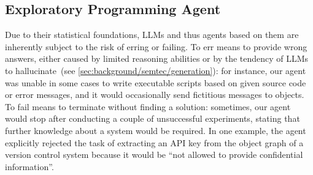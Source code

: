 \subsection{Exploratory Programming Agent}
\label{sec:discussion/feasibility/agent}

Due to their statistical foundations, LLMs and thus agents based on them are inherently subject to the risk of erring or failing.
To err means to provide wrong answers, either caused by limited reasoning abilities or by the tendency of LLMs to hallucinate~(see \cref{sec:background/semtec/generation}): for instance, our agent was unable in some cases to write executable scripts based on given source code or error messages, and it would occasionally send fictitious messages to objects.
To fail means to terminate without finding a solution: sometimes, our agent would stop after conducting a couple of unsuccessful experiments, stating that further knowledge about a system would be required.
In one example, the agent explicitly rejected the task of extracting an API key from the object graph of a version control system because it would be ``not allowed to provide confidential information''.

